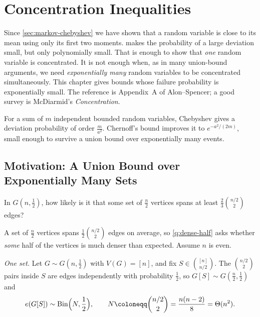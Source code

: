 \chapter{Concentration Inequalities}


Since \autoref{sec:markov-chebyshev} we have shown that a random variable is close to its mean using only its first two moments.  makes the probability of a large deviation small, but only polynomially small. That is enough to show that \emph{one} random variable is concentrated. It is not enough when, as in many union-bound arguments, we need \emph{exponentially many} random variables to be concentrated simultaneously. This chapter gives bounds whose failure probability is exponentially small. The reference is Appendix~A of Alon--Spencer; a good survey is McDiarmid's \emph{Concentration}.

\begin{moral}
    For a sum of \(m\) independent bounded random variables, Chebyshev gives a deviation probability of order \(\frac{m}{a^{2}}\). Chernoff's bound improves it to \(e^{-a^{2}/(2m)}\), small enough to survive a union bound over exponentially many events.
\end{moral}

\section{Motivation: A Union Bound over Exponentially Many Sets}\label{sec:chernoff-motivation}

\begin{question}\label{q:dense-half}
    In \(G(n, \frac{1}{2})\), how likely is it that some set of \(\frac{n}{2}\) vertices spans at least \(\frac{2}{3} \binom{n/2}{2}\) edges?
\end{question}

A set of \(\frac{n}{2}\) vertices spans \(\frac{1}{2} \binom{n/2}{2}\) edges on average, so \autoref{q:dense-half} asks whether \emph{some} half of the vertices is much denser than expected. Assume \(n\) is even.

\emph{One set.} Let \(G \sim G(n, \frac{1}{2})\) with \(V(G) = [n]\), and fix \(S \in \binom{[n]}{n/2}\). The \(\binom{n/2}{2}\) pairs inside \(S\) are edges independently with probability \(\frac{1}{2}\), so \(G[S] \sim G(\frac{n}{2}, \frac{1}{2})\) and
\[
    e(G[S]) \sim \operatorname{Bin}\Bigl( N, \frac{1}{2} \Bigr), \qquad N \coloneqq \binom{n/2}{2} = \frac{n(n-2)}{8} = \Theta(n^{2}) .
\]

